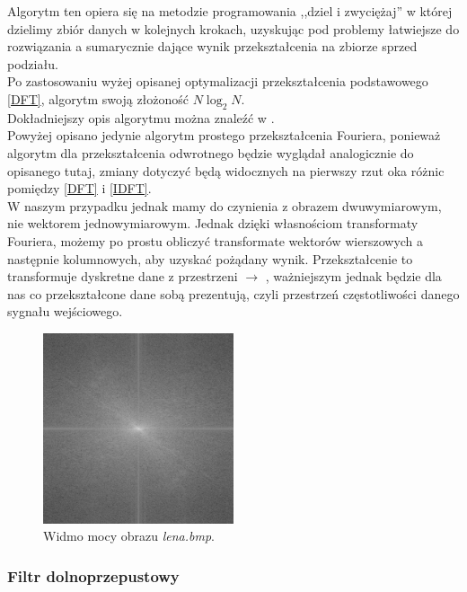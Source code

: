 \documentclass{classrep}
\begin{document}
\indent Algorytm ten opiera się na metodzie programowania ,,dziel i zwyciężaj'' w której dzielimy zbiór danych w kolejnych krokach, uzyskując pod problemy łatwiejsze do rozwiązania a sumarycznie dające wynik przekształcenia na zbiorze sprzed podziału.\\
Po zastosowaniu wyżej opisanej optymalizacji przekształcenia podstawowego \ref{DFT}, algorytm swoją złożoność $N \log _{2} N$.\\
Dokładniejszy opis algorytmu można znaleźć w \cite{1}.\\

\indent Powyżej opisano jedynie algorytm prostego przekształcenia Fouriera, ponieważ algorytm dla przekształcenia odwrotnego będzie wyglądał analogicznie do opisanego tutaj, zmiany dotyczyć będą widocznych na pierwszy rzut oka różnic pomiędzy \ref{DFT} i \ref{IDFT}.\\

\indent W naszym przypadku jednak mamy do czynienia z obrazem dwuwymiarowym, nie wektorem jednowymiarowym. Jednak dzięki własnościom transformaty Fouriera, możemy po prostu obliczyć transformate wektorów wierszowych a następnie kolumnowych, aby uzyskać pożądany wynik.
Przekształcenie to transformuje dyskretne dane z przestrzeni  $\rightarrow$ , ważniejszym jednak będzie dla nas co przekształcone dane sobą prezentują, czyli przestrzeń częstotliwości danego sygnału wejściowego.

\begin{figure}[H]
  \centering
  \includegraphics[width=0.5\textwidth]{img/lena_orig}
  \caption{Widmo mocy obrazu \emph{lena.bmp}.}
  \label{fig_widmo_lena_orig}
\end{figure}


\subsubsection{Filtr dolnoprzepustowy}
\end{document}
